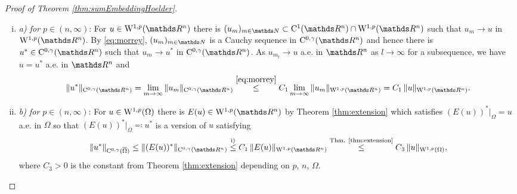 \begin{proof}[Proof of Theorem \ref{thm:sumEmbeddingHoelder}]
  \begin{enumerate}[i)]
    \item \emph{a) for $p \in (n,\infty)$}:
      For $u \in \WW^{1,p}(\R^n)$ there is $(u_m)_{m \in \N} \subset \CC^1(\R^n) \cap \WW^{1,p}(\R^n)$ such that $u_m \to u$ in $\WW^{1,p}(\R^n)$.
      By \eqref{eq:morrey}, $(u_m)_{m \in \N}$ is a Cauchy sequence in $\CC^{0,\gamma}(\R^n)$ and hence there is $u^* \in \CC^{0,\gamma}(\R^n)$ such that $u_m \to u^*$ in $\CC^{0,\gamma}(\R^n)$.
      As $u_{m_l} \to u$ a.e. in $\R^n$ as $l \to \infty$ for a subsequence, we have $u = u^*$ a.e. in $\R^n$ and 
      $$
      \|u^*\|_{\CC^{0,\gamma}(\R^n)}
      = \lim_{m \to \infty} \| u_m\|_{\CC^{0,\gamma}(\R^n)}
      \overset{\eqref{eq:morrey}}{\leq} C_1 \lim_{m \to \infty} \|u_m\|_{\WW^{1,p}(\R^n)}
      = C_1 \, \|u\|_{\WW^{1,p}(\R^n)}.
      $$

    \item \emph{b) for $p \in (n,\infty)$}:
      For $u \in \mathrm{W}^{1,p}(\Omega)$ there is $E(u) \in \WW^{1,p}(\R^n)$ by Theorem \ref{thm:extension} which satisfies $(E(u))^*|_\Omega = u$ a.e. in $\Omega$ so that $(E(u))^*|_\Omega \eqqcolon u^*$ is a version of $u$ satisfying
      $$
      \|u^*\|_{\CC^{0,\gamma}(\overline\Omega)}
      \leq \| (E(u))^*\|_{\CC^{0,\gamma}(\R^n)}
      \overset{\text{i)}}{\leq} C_1 \, \|E(u)\|_{\WW^{1,p}(\R^n)}
      \overset{\text{Thm. \ref{thm:extension}}}{\leq} C_3 \, \|u\|_{\WW^{1,p}(\Omega)},
      $$
      where $C_3 > 0$ is the constant from Theorem \ref{thm:extension} depending on $p$, $n$, $\Omega$.


\end{enumerate}
\end{proof}
